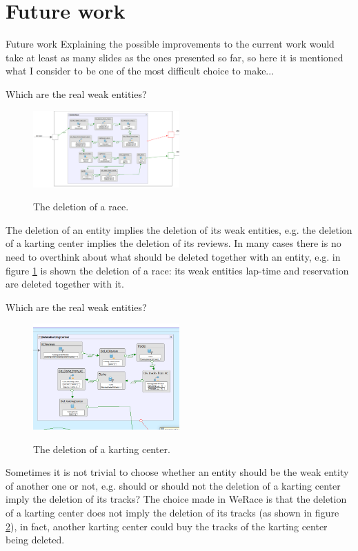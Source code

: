 \documentclass{beamer}
\newcommand{\kc}{WeRace}
\begin{document}
\section{Future work}
\begin{frame}{Future work}
Explaining the possible improvements to the current work
would take at least as many slides as the ones presented so far,
so here it is mentioned what I consider to be one of the most difficult choice
to make...
\end{frame}

\begin{frame}{Which are the real weak entities?}
    \scriptsize
    \begin{figure}
        \centering
        \includegraphics[width=0.5\textwidth]{drawio/del-race.png}
        \label{fig:delete-race}
        \caption{The deletion of a race.}
    \end{figure} 
    The deletion of an entity implies the deletion of its weak entities, 
    e.g. the deletion of a karting center implies the deletion of its reviews.
    In many cases there is no need to overthink about what should be deleted together 
    with an entity, e.g. in figure \ref{fig:delete-race} is shown the deletion 
    of a race: its weak entities lap-time and reservation are deleted together with it.
\end{frame}

\begin{frame}{Which are the real weak entities?}
    \scriptsize
    \begin{figure}
        \centering
        \includegraphics[width=0.5\textwidth]{drawio/del-karting-center.png}
        \label{fig:delete-karting-center}
        \caption{The deletion of a karting center.}
    \end{figure}
    Sometimes it is not trivial to choose whether an entity should be the weak
    entity of another one or not, e.g. should or should not the deletion of a karting center
    imply the deletion of its tracks?    
    The choice made in \kc{} is that the deletion of a karting center does 
    not imply the deletion of its tracks (as shown in figure \ref{fig:delete-karting-center}),
    in fact, another karting center could buy the tracks of the karting center being deleted.
\end{frame}
\end{document}
